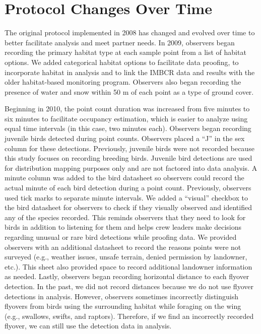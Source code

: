 \documentclass[
  letterpaper,
  DIV=11,
  numbers=noendperiod,
  oneside]{scrreprt}
\begin{document}
\hypertarget{protocol-changes-over-time}{%
\chapter{Protocol Changes Over Time}\label{protocol-changes-over-time}}

The original protocol implemented in 2008 has changed and evolved over
time to better facilitate analysis and meet partner needs. In 2009,
observers began recording the primary habitat type at each sample point
from a list of habitat options. We added categorical habitat options to
facilitate data proofing, to incorporate habitat in analysis and to link
the IMBCR data and results with the older habitat-based monitoring
program. Observers also began recording the presence of water and snow
within 50 m of each point as a type of ground cover.

Beginning in 2010, the point count duration was increased from five
minutes to six minutes to facilitate occupancy estimation, which is
easier to analyze using equal time intervals (in this case, two minutes
each). Observers began recording juvenile birds detected during point
counts. Observers placed a ``J'' in the sex column for these detections.
Previously, juvenile birds were not recorded because this study focuses
on recording breeding birds. Juvenile bird detections are used for
distribution mapping purposes only and are not factored into data
analysis. A minute column was added to the bird datasheet so observers
could record the actual minute of each bird detection during a point
count. Previously, observers used tick marks to separate minute
intervals. We added a ``visual'' checkbox to the bird datasheet for
observers to check if they visually observed and identified any of the
species recorded. This reminds observers that they need to look for
birds in addition to listening for them and helps crew leaders make
decisions regarding unusual or rare bird detections while proofing data.
We provided observers with an additional datasheet to record the reasons
points were not surveyed (e.g., weather issues, unsafe terrain, denied
permission by landowner, etc.). This sheet also provided space to record
additional landowner information as needed. Lastly, observers began
recording horizontal distance to each flyover detection. In the past, we
did not record distances because we do not use flyover detections in
analysis. However, observers sometimes incorrectly distinguish flyovers
from birds using the surrounding habitat while foraging on the wing
(e.g., swallows, swifts, and raptors). Therefore, if we find an
incorrectly recorded flyover, we can still use the detection data in
analysis.
\end{document}
